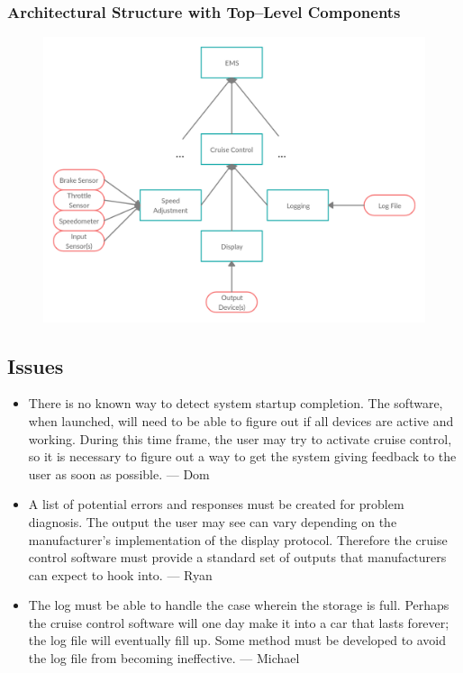\documentclass{article}
\begin{document}
	\newpage
	\subsubsection{Architectural Structure with Top--Level Components}
	\begin{figure}[!htb]
		\centering
		\includegraphics[scale=.28]{cs347_5b}
	\end{figure}
	
	\subsection{Issues}
	\begin{itemize}
		\item There is no known way to detect system startup completion. The software, when launched, will need to be able to figure out if all devices are active and working. During this time frame, the user may try to activate cruise control, so it is necessary to figure out a way to get the system giving feedback to the user as soon as possible. --- Dom
		\item A list of potential errors and responses must be created for problem diagnosis. The output the user may see can vary depending on the manufacturer's implementation of the display protocol. Therefore the cruise control software must provide a standard set of outputs that manufacturers can expect to hook into. --- Ryan
		\item The log must be able to handle the case wherein the storage is full. Perhaps the cruise control software will one day make it into a car that lasts forever; the log file will eventually fill up. Some method must be developed to avoid the log file from becoming ineffective. --- Michael
		
	\end{itemize}
	
\end{document}
